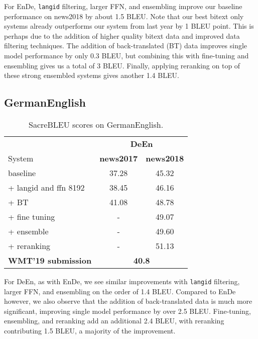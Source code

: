 \documentclass[11pt,a4paper]{article}
\newcommand{\entode}{EnDe}
\newcommand{\detoen}{DeEn}
\begin{document}
For \entode{}, \texttt{langid} filtering, larger FFN, and ensembling improve our baseline performance on news2018 by about 1.5 BLEU.
Note that our best bitext only systems already outperforms our system from last year by 1 BLEU point.
This is perhaps due to the addition of higher quality bitext data and improved data filtering techniques.
The addition of back-translated (BT) data improves single model performance by only 0.3 BLEU, but combining this with fine-tuning and ensembling gives us a total of 3 BLEU.
Finally, applying reranking on top of these strong ensembled systems gives another 1.4 BLEU.

\subsection{GermanEnglish}
\begin{table}[t]
\centering
\begin{tabular}{lcc}
\toprule
& \multicolumn{2}{c}{\textbf{\detoen{}}} \\
System & \bf news2017 & \bf news2018 \\ \midrule
baseline & 37.28  & 45.32 \\ 
+ langid and ffn 8192 & 38.45 & 46.16 \\
+ BT & 41.08 & 48.78 \\
+ fine tuning & - & 49.07 \\
+ ensemble & - & 49.60 \\
+ reranking & - & 51.13\\
\midrule
\bf WMT'19 submission & \multicolumn{2}{c}{\bf 40.8} \\ 
\bottomrule
\end{tabular}
\caption{SacreBLEU scores on GermanEnglish.}
\label{tab:ablation_deen}
\end{table}

For \detoen{}, as with \entode{}, we see similar improvements with \texttt{langid} filtering, larger FFN, and ensembling on the order of 1.4 BLEU.
Compared to \entode{} however, we also observe that the addition of back-translated data is much more significant, improving single model performance by over 2.5 BLEU. 
Fine-tuning, ensembling, and reranking add an additional 2.4 BLEU, with reranking contributing 1.5 BLEU, a majority of the improvement.
\end{document}
